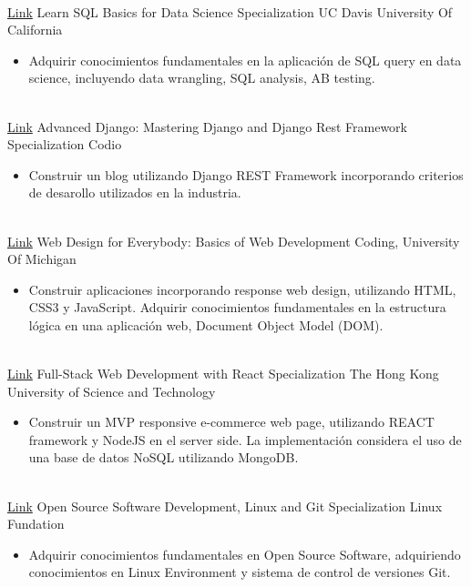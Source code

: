 \documentclass[letterpaper]{DS_class_file} %
\begin{document}
\begin{twenty}
{	}
	\\
	\twentyitem
	{\href{https://www.coursera.org/specializations/learn-sql-basics-data-science}{Link}}
	{}
	{\hspace{0.1cm}Learn SQL Basics for Data Science Specialization}
	{UC Davis University Of California}
	{}
	{
		{\begin{itemize}
				\item Adquirir conocimientos fundamentales en la aplicación de SQL query en data science, incluyendo  data wrangling, SQL analysis, AB testing. %
		\end{itemize}}
	}
	\\
	\twentyitem
	{\href{https://github.com/maaferna/codio_blango}{Link}}
	{}
	{\hspace{0.1cm}Advanced Django: Mastering Django and Django Rest Framework Specialization}
	{Codio}
	{}
	{
		{\begin{itemize}
				\item Construir un blog utilizando Django REST Framework incorporando criterios de desarollo utilizados en la industria.
		\end{itemize}}
	}
	\\
	\twentyitem
	{\href{https://www.coursera.org/specializations/web-design}{Link}}
	{}
	{\hspace{0.1cm}Web Design for Everybody: Basics of Web Development  Coding,}
	{University Of Michigan}
	{}
	{
		{\begin{itemize}
				\item Construir aplicaciones incorporando response web design, utilizando HTML, CSS3 y JavaScript. Adquirir conocimientos fundamentales en la estructura lógica en una aplicación web, Document Object Model (DOM).
		\end{itemize}}
	}
	\\
	\twentyitem
	{\href{https://github.com/maaferna/react_project}{Link}}
	{}
	{\hspace{0.1cm}Full-Stack Web Development with React Specialization}
	{The Hong Kong University of Science and Technology}
	{}
	{
		{\begin{itemize}
				\item Construir un MVP responsive e-commerce web page, utilizando REACT framework y NodeJS en el server side. La implementación considera el uso de una base de datos NoSQL utilizando MongoDB.
		\end{itemize}}
	}
	\\
	\twentyitem
	{\href{https://www.coursera.org/specializations/oss-development-linux-git}{Link}}
	{}
	{\hspace{0.1cm}Open Source Software Development, Linux and Git Specialization}
	{Linux Fundation}
	{}
	{
		{\begin{itemize}
				\item Adquirir conocimientos fundamentales en Open Source Software, adquiriendo conocimientos en Linux Environment y sistema de control de versiones Git.
		\end{itemize}}
	}

\end{twenty}
\end{document}
